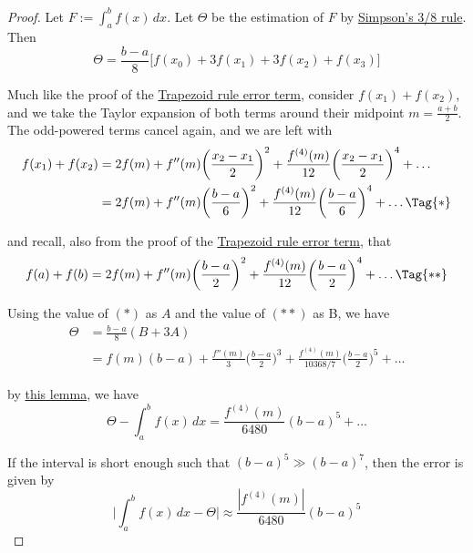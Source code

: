 \begin{proof}
  Let $F:=\int_a^bf(x)\,dx$. Let $\Theta$ be the estimation of $F$ by
  \href{f6c4ae6}{Simpson's 3/8 rule}. Then
  $$
    \Theta=\frac{b-a}8\bigl[f(x_0)+3f(x_1)+3f(x_2)+f(x_3)\bigr]
  $$

  Much like the proof of the \href{cd8528b}{Trapezoid rule error term},
  consider $f(x_1)+f(x_2)$, and we take the Taylor expansion of both terms
  around their midpoint $m=\frac{a+b}2$. The odd-powered terms cancel again,
  and we are left with
  \begin{align*}
    f(x_1)+f(x_2) &=2f(m)+f''(m)\biggl(\frac{x_2-x_1}2\biggr)^2+\frac{f^{(4)}(m)}{12}\biggl(\frac{x_2-x_1}2\biggr)^4+\ldots \\
                  &=2f(m)+f''(m)\biggl(\frac{b-a}6\biggr)^2+\frac{f^{(4)}(m)}{12}\biggl(\frac{b-a}6\biggr)^4+\ldots\Tag{*}
  \end{align*}

  and recall, also from the proof of the \href{cd8528b}{Trapezoid rule error
  term}, that
  \begin{align*}
    f(a)+f(b)=2f(m)+f''(m)\biggl(\frac{b-a}2\biggr)^2+\frac{f^{(4)}(m)}{12}\biggl(\frac{b-a}2\biggr)^4+\ldots\Tag{**}
  \end{align*}

  Using the value of $(*)$ as $A$ and the value of $(**)$ as B, we have
  \begin{align*}
    \Theta &=\frac{b-a}8(B+3A)                                                                                                \\
           &=f(m)(b-a)+\frac{f''(m)}3\biggl(\frac{b-a}2\biggr)^3+\frac{f^{(4)}(m)}{10368/7}\biggl(\frac{b-a}2\biggr)^5+\ldots
  \end{align*}

  by \href{b024138}{this lemma}, we have
  $$
    \Theta-\int_a^bf(x)\,dx=\frac{f^{(4)}(m)}{6480}(b-a)^5+\ldots
  $$

  If the interval is short enough such that $(b-a)^5\gg(b-a)^7$, then the error
  is given by
  $$
    \biggl|\int_a^bf(x)\,dx-\Theta\biggr|\approx\frac{|f^{(4)}(m)|}{6480}(b-a)^5
  $$
\end{proof}
